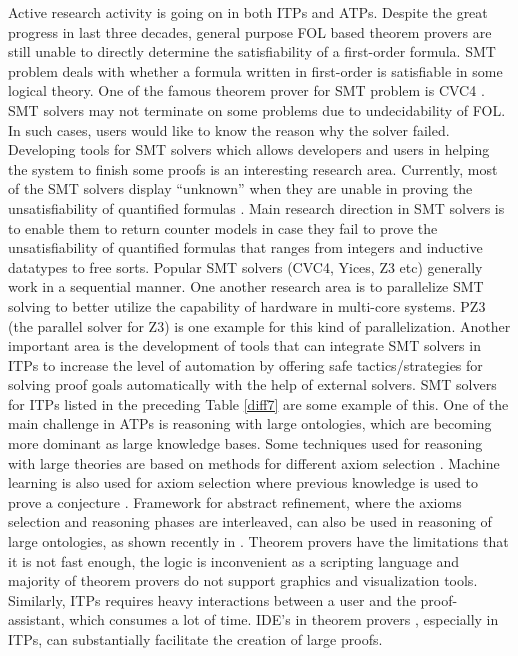 Active research activity is going on in both ITPs and ATPs. 
Despite the great progress in last three decades, general purpose FOL based theorem provers are still unable to directly 
determine the satisfiability of a first-order formula. 
SMT problem deals with whether a formula written in first-order is satisfiable in some logical theory. 
One of the famous theorem prover for SMT problem is CVC4 . 
SMT solvers may not terminate on some problems due to undecidability of FOL.
In such cases, users would like to know the reason why the solver failed. 
Developing tools for SMT solvers which allows developers and users in helping the system to finish some proofs is an
interesting research area.
Currently, most of the SMT solvers display ``unknown'' when they are unable in proving the unsatisfiability of 
quantified formulas . Main research direction in SMT solvers is to enable them to return counter models 
in case they fail to prove the unsatisfiability of quantified formulas that ranges from integers and inductive datatypes to free sorts. Popular SMT solvers (CVC4, Yices, Z3 etc) generally work in a sequential manner. One another research area is to parallelize SMT solving to better utilize the capability of hardware in multi-core systems. 
PZ3  (the parallel solver for Z3) is one example for this kind of parallelization.
Another important area is the development of tools that can integrate SMT solvers in ITPs 
to increase the level of automation by offering safe tactics/strategies for solving proof goals automatically with the help of
external solvers. SMT solvers for ITPs listed in the preceding Table \ref{diff7} are some example of this. 
One of the main challenge in ATPs is reasoning with large ontologies, which are becoming more dominant
as large knowledge bases. Some techniques used for reasoning with large theories are based 
on methods for different axiom selection . 
Machine learning is also used for axiom selection where previous knowledge is used to prove a 
conjecture . 
Framework for abstract refinement, where the axioms selection and reasoning phases are interleaved, can 
also be used in reasoning of large ontologies, as shown recently in  .
Theorem provers have the limitations that it is not fast enough, the logic is inconvenient as a scripting
language and majority of theorem provers do not support graphics and visualization tools. Similarly, ITPs requires
heavy interactions between a user and the proof-assistant, which consumes a lot of time. 
IDE's in theorem provers , especially in ITPs, can substantially facilitate the creation of large proofs. 
